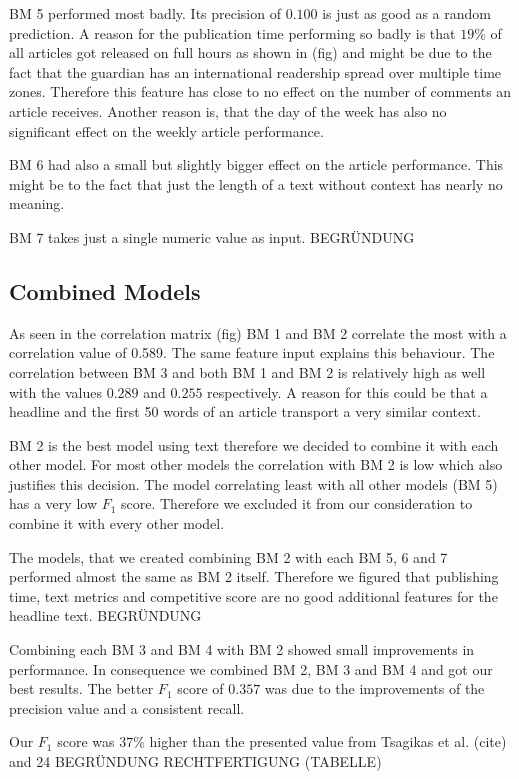 BM 5 performed most badly. Its precision of $0.100$ is just as good as a random prediction. A reason for the publication time performing so badly is that $19\%$ of all articles got released on full hours as shown in (fig) and might be due to the fact that the guardian has an international readership spread over multiple time zones. Therefore this feature has close to no effect on the number of comments an article receives. Another reason is, that the day of the week has also no significant effect on the weekly article performance.

BM 6 had also a small but slightly bigger effect on the article performance. This might be to the fact that just the length of a text without context has nearly no meaning.

BM 7 takes just a single numeric value as input.
BEGRÜNDUNG



\subsection{Combined Models}
As seen in the correlation matrix (fig) BM 1 and BM 2 correlate the most with a correlation value of 0.589. The same feature input explains this behaviour. The correlation between BM 3 and both BM 1 and BM 2 is relatively high as well with the values $0.289$ and $0.255$ respectively. A reason for this could be that a headline and the first 50 words of an article transport a very similar context.

BM 2 is the best model using text therefore we decided to combine it with each other model. For most other models the correlation with BM 2 is low which also justifies this decision.
The model correlating least with all other models (BM 5) has a very low $F_1$ score. Therefore we excluded it from our consideration to combine it with every other model.

The models, that we created combining BM 2 with each BM 5, 6 and 7 performed almost the same as BM 2 itself. Therefore we figured that publishing time, text metrics and competitive score are no good additional features for the headline text.
BEGRÜNDUNG

Combining each BM 3 and BM 4 with BM 2 showed small improvements in performance. In consequence we combined BM 2, BM 3 and BM 4 and got our best results. The better $F_1$ score of $0.357$ was due to the improvements of the precision value and a consistent recall.

Our $F_1$ score was $37\%$ higher than the presented value from Tsagikas et al. (cite) and 24%
BEGRÜNDUNG  RECHTFERTIGUNG
(TABELLE)



